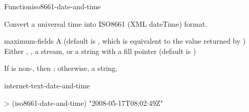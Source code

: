 \documentclass[10pt,twoside,english,pdftex]{article}
\begin{document}
\begin{functiondoc}{Function}{iso8661-date-and-time}{%
      
    \returns{} }
% 

\fnsyntax

\fnpurpose Convert a universal time into ISO8661 (XML dateTime) format.

\fnpackage {}

\fnmodule {}

\fnargs
\begin{args}{maximum-fields}
 A  (default is \nil,
  which is equivalent to the value returned by
  )
\arg[destination] Either \nil, , a stream, or a string with a fill 
pointer (default is \nil)
\end{args}

\fnreturns If  is non-\nil, then \nil; otherwise, a string.

\begin{alsos}{internet-text-date-and-time}
\end{alsos}

\fnexample
%
\W\supp
\begin{example}
> (iso8661-date-and-time)
"2008-05-17T08:02:49Z"
\end{example}

\end{functiondoc}

\end{document}
